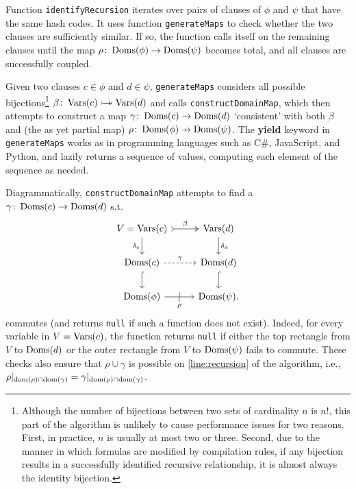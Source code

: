 Function \texttt{identifyRecursion} iterates over pairs of clauses of $\phi$ and
$\psi$ that have the same hash codes. It uses function \texttt{generateMaps} to
check whether the two clauses are sufficiently similar. If so, the function
calls itself on the remaining clauses until the map
$\rho\colon \operatorname{Doms}(\phi) \to \operatorname{Doms}(\psi)$ becomes total, and all clauses are
successfully coupled.


Given two clauses $c \in \phi$ and $d \in \psi$, \texttt{generateMaps} considers
all possible bijections\footnote{Although the number of bijections between two
  sets of cardinality $n$ is $n!$, this part of the algorithm is unlikely to
  cause performance issues for two reasons. First, in practice, $n$ is usually
  at most two or three. Second, due to the manner in which formulas are modified
  by compilation rules, if any bijection results in a successfully identified
  recursive relationship, it is almost always the identity bijection.}
$\beta\colon \operatorname{Vars}(c) \mathrel{\rightarrowtail\kern-1.9ex\twoheadrightarrow} \operatorname{Vars}(d)$ and calls
\texttt{constructDomainMap}, which then attempts to construct a map
$\gamma\colon \operatorname{Doms}(c) \to \operatorname{Doms}(d)$ `consistent' with both $\beta$ and (the as
yet partial map) $\rho\colon \Doms(\phi) \pfun \Doms(\psi)$. The \textbf{yield}
keyword in \texttt{generateMaps} works as in programming languages such as C\#,
JavaScript, and Python, and lazily returns a sequence of values, computing each
element of the sequence as needed.

Diagrammatically, \texttt{constructDomainMap} attempts to find a
$\gamma\colon \operatorname{Doms}(c) \to \operatorname{Doms}(d)$ s.t.
\begin{equation} \label{eq:commute}
  \begin{tikzcd}
    V = \Vars(c) \ar[r, tail, two heads, "\beta"] \arrow[d, swap, "\delta_c"] & \Vars(d) \ar[d, "\delta_d"] \\
    \Doms(c) \ar[r, dashed, "\gamma"] \ar[d, hookrightarrow] & \Doms(d) \ar[d, hookrightarrow] \\
    \Doms(\phi) \ar[r, swap, "\rho", "|" marking, outer sep=5pt] & \Doms(\psi).
  \end{tikzcd}
\end{equation}
commutes (and returns \texttt{null} if such a function does not exist). Indeed,
for every variable in $V = \operatorname{Vars}(c)$, the function returns \texttt{null} if
either the top rectangle from $V$ to $\operatorname{Doms}(d)$ or the outer rectangle from $V$
to $\operatorname{Doms}(\psi)$ fails to commute. These checks also ensure that
$\rho \cup \gamma$ is possible on \cref{line:recursion} of the algorithm, i.e.,
$\rho|_{\operatorname{dom}(\rho)\cap\operatorname{dom}(\gamma)} = \gamma|_{\operatorname{dom}(\rho)\cap\operatorname{dom}(\gamma)}$.

